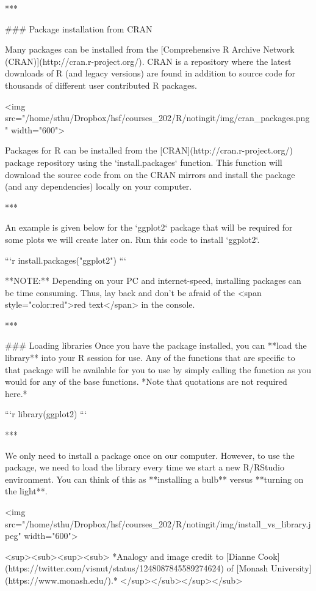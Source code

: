{{***

### Package installation from CRAN 

Many packages can be installed from the [Comprehensive R Archive Network (CRAN)](http://cran.r-project.org/).
CRAN is a repository where the latest downloads of R (and legacy versions) are found in addition to source code for thousands of different user contributed R packages.

<img src="/home/sthu/Dropbox/hsf/courses_202/R/notingit/img/cran_packages.png" width="600">

Packages for R can be installed from the [CRAN](http://cran.r-project.org/) package repository using the `install.packages` function. This function will download the source code from on the CRAN mirrors and install the package (and any dependencies) locally on your computer. 

***

An example is given below for the `ggplot2` package that will be required for some plots we will create later on. Run this code to install `ggplot2`.

```r
install.packages("ggplot2")
```

**NOTE:** Depending on your PC and internet-speed, installing packages can be time consuming. Thus, lay back and don't be afraid of the <span style="color:red">red text</span> in the console.

***

### Loading libraries
Once you have the package installed, you can **load the library** into your R session for use. Any of the functions that are specific to that package will be available for you to use by simply calling the function as you would for any of the base functions. *Note that quotations are not required here.*


```r
library(ggplot2)
```

***

We only need to install a package once on our computer. However, to use the package, we need to load the library every time we start a new R/RStudio environment. You can think of this as **installing a bulb** versus **turning on the light**. 

<img src="/home/sthu/Dropbox/hsf/courses_202/R/notingit/img/install_vs_library.jpeg" width="600">

<sup><sub><sup><sub>
*Analogy and image credit to [Dianne Cook](https://twitter.com/visnut/status/1248087845589274624) of [Monash University](https://www.monash.edu/).* 
</sup></sub></sup></sub>

}}
